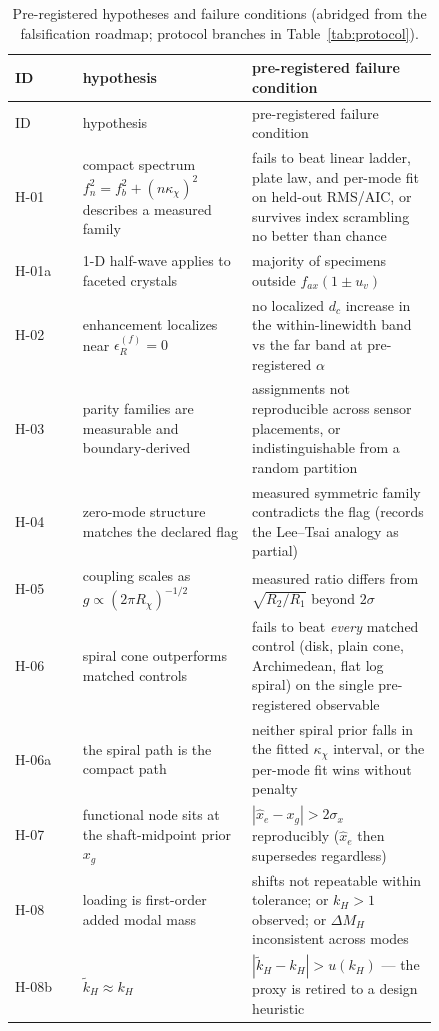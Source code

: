 \documentclass[10pt,letterpaper]{article}
\newcommand{\epsR}{\epsilon_{R}^{(f)}}
\newcommand{\Rchi}{R_{\chi}}
\newcommand{\kchi}{\kappa_{\chi}}
\newcommand{\fb}{f_{b}}
\newcommand{\uv}{u_{v}}
\begin{document}
\small
\begin{longtable}{@{}l p{0.40\linewidth} p{0.44\linewidth}@{}}
\caption{Pre-registered hypotheses and failure conditions (abridged from
the falsification roadmap; protocol branches in
Table~\ref{tab:protocol}).}\label{tab:roadmap}\\
\toprule
ID & hypothesis & pre-registered failure condition \\
\midrule
\endfirsthead
\toprule
ID & hypothesis & pre-registered failure condition \\
\midrule
\endhead
H-01 & compact spectrum $f_n^2 = \fb^2 + (n\kchi)^2$ describes a measured
family & fails to beat linear ladder, plate law, and per-mode fit on
held-out RMS/AIC, or survives index scrambling no better than chance \\
H-01a & 1-D half-wave applies to faceted crystals & majority of specimens
outside $f_{ax}(1 \pm \uv)$ \\
H-02 & enhancement localizes near $\epsR = 0$ & no localized $d_c$
increase in the within-linewidth band vs the far band at pre-registered
$\alpha$ \\
H-03 & parity families are measurable and boundary-derived & assignments
not reproducible across sensor placements, or indistinguishable from a
random partition \\
H-04 & zero-mode structure matches the declared flag & measured symmetric
family contradicts the flag (records the Lee--Tsai analogy as partial) \\
H-05 & coupling scales as $g \propto (2\pi\Rchi)^{-1/2}$ & measured ratio
differs from $\sqrt{R_2/R_1}$ beyond $2\sigma$ \\
H-06 & spiral cone outperforms matched controls & fails to beat
\emph{every} matched control (disk, plain cone, Archimedean, flat log
spiral) on the single pre-registered observable \\
H-06a & the spiral path is the compact path & neither spiral prior falls
in the fitted $\kchi$ interval, or the per-mode fit wins without penalty \\
H-07 & functional node sits at the shaft-midpoint prior $x_g$ &
$|\hat x_e - x_g| > 2\sigma_x$ reproducibly ($\hat x_e$ then supersedes
regardless) \\
H-08 & loading is first-order added modal mass & shifts not repeatable
within tolerance; or $k_H > 1$ observed; or $\Delta M_H$ inconsistent
across modes \\
H-08b & $\tilde k_H \approx k_H$ & $|\tilde k_H - k_H| > u(k_H)$ — the
proxy is retired to a design heuristic \\

\end{longtable}
\end{document}
